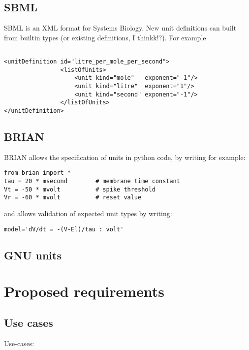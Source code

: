 \documentclass{article}
\begin{document}
\subsection*{SBML}
SBML is an XML format for Systems Biology. New unit definitions can built from builtin types (or existing definitions, I thinkk!?).
For example

\begin{lstlisting}

<unitDefinition id="litre_per_mole_per_second">
                <listOfUnits>
                    <unit kind="mole"   exponent="-1"/>
                    <unit kind="litre"  exponent="1"/>
                    <unit kind="second" exponent="-1"/>
                </listOfUnits>
</unitDefinition>
\end{lstlisting}



\subsection*{BRIAN}
BRIAN allows the specification of units in python code, by writing for example:

\begin{lstlisting}
from brian import *
tau = 20 * msecond        # membrane time constant
Vt = -50 * mvolt          # spike threshold
Vr = -60 * mvolt          # reset value
\end{lstlisting}

and allows validation of expected unit types by writing:
\begin{lstlisting}
model='dV/dt = -(V-El)/tau : volt'
\end{lstlisting}


\subsection*{GNU units}




\newpage
\section*{Proposed requirements} 
\subsection{Use cases}
Use-cases:
\end{document}
